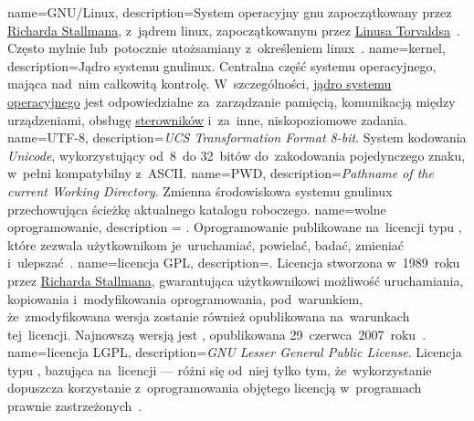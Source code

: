 {
	name={GNU/Linux},
	description={System operacyjny \gls{gnu} zapoczątkowany przez \href{https://en.wikipedia.org/wiki/Richard_Stallman}{Richarda Stallmana}, z~jądrem \gls{linux}, zapoczątkowanym przez \href{https://en.wikipedia.org/wiki/Linus_Torvalds}{Linusa Torvaldsa}~\cite{gnulinux}. Często mylnie lub~potocznie utożsamiany z~określeniem \gls{linux}~\cite{gnu-faq,wiki:linux-naming-controversy}.}
}
{
	name={kernel},
	description={Jądro systemu \gls{gnulinux}. Centralna część systemu operacyjnego, mająca nad~nim całkowitą kontrolę. W~szczególności, \href{https://en.wikipedia.org/wiki/Kernel_(operating_system)}{jądro systemu operacyjnego} jest odpowiedzialne za~zarządzanie pamięcią, komunikacją między urządzeniami, obsługę \href{https://lwn.net/Kernel/LDD3/}{sterowników} i~za~inne, niskopoziomowe zadania.}
}
{
	name={UTF-8},
	description={\emph{UCS Transformation Format 8-bit}. System kodowania \emph{Unicode}, wykorzystujący od~8~do 32~bitów do~zakodowania pojedynczego znaku, w~pełni kompatybilny z~\gls{ASCII}.}
}
{
	name={PWD},
	description={\emph{Pathname of the current Working Directory}. Zmienna środowiskowa systemu \gls{gnulinux} przechowująca ścieżkę aktualnego katalogu roboczego.}
}
{
	name={wolne oprogramowanie},
	description = {. Oprogramowanie publikowane na~licencji typu , które zezwala użytkownikom je~uruchamiać, powielać, badać, zmieniać i~ulepszać~\cite{free-software}.}
}
{
	name={licencja GPL},
	description={. Licencja  stworzona w~1989~roku przez \href{https://en.wikipedia.org/wiki/Richard_Stallman}{Richarda Stallmana}, gwarantująca użytkownikowi możliwość uruchamiania, kopiowania i~modyfikowania oprogramowania, pod~warunkiem, że~zmodyfikowana wersja zostanie również opublikowana na~warunkach tej~licencji. Najnowszą wersją  jest , opublikowana 29~czerwca~2007~roku~\cite{gpl3,wiki:licenses-comparison}.}
}
{
	name={licencja LGPL},
	description={\emph{GNU Lesser General Public License}. Licencja typu , bazująca na~licencji  --- różni się od~niej tylko tym, że~wykorzystanie  dopuszcza korzystanie z~oprogramowania objętego licencją w~programach prawnie zastrzeżonych~\cite{lgpl3,why-not-lgpl,wiki:licenses-comparison}.}
}
